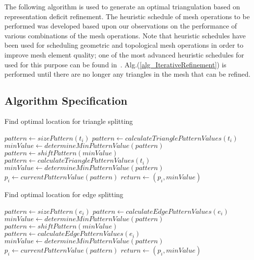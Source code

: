The following algorithm is used to generate an optimal triangulation
based on representation deficit refinement.  The heuristic schedule of 
mesh operations to be performed was developed based upon our observations 
on the performance of various combinations of the mesh operations.
Note that heuristic schedules have been used for scheduling geometric and 
topological mesh operations in order to improve mesh element quality; one 
of the most advanced heuristic schedules for used for this purpose can be 
found in~\cite{tet_aggressive}. Alg.(\ref{alg_IterativeRefinement}) is
performed until there are no longer any triangles in the mesh that can
be refined.

\subsection{Algorithm Specification}
\begin{algorithm}[H]
\begin{algorithmic}
\caption{Find optimal location for triangle splitting}
 
  \State $pattern \gets sizePattern\left( t_i \right)$
  \State $pattern \gets calculateTrianglePatternValues\left( t_i \right)$
  \State $minValue \gets determineMinPatternValue\left( pattern \right)$
    \State $pattern \gets shiftPattern\left( minValue \right)$
    \State $pattern \gets calculateTrianglePatternValues\left( t_i \right)$
    \State $minValue \gets determineMinPatternValue\left( pattern \right)$
  \EndWhile
  \State $p_i \gets currentPatternValue\left( pattern \right)$
  \State $return \gets \left( p_i, minValue \right)$
\EndProcedure
\end{algorithmic}
\end{algorithm}

\begin{algorithm}[H]
\begin{algorithmic}
\caption{Find optimal location for edge splitting}
 
  \State $pattern \gets sizePattern\left( e_i \right)$
  \State $pattern \gets calculateEdgePatternValues\left( e_i \right)$
  \State $minValue \gets determineMinPatternValue\left( pattern \right)$
    \State $pattern \gets shiftPattern\left( minValue \right)$
    \State $pattern \gets calculateEdgePatternValues\left( e_i \right)$
    \State $minValue \gets determineMinPatternValue\left( pattern \right)$
  \EndWhile
  \State $p_i \gets currentPatternValue\left( pattern \right)$
  \State $return \gets \left( p_i, minValue \right)$
\EndProcedure
\end{algorithmic}
\end{algorithm}

